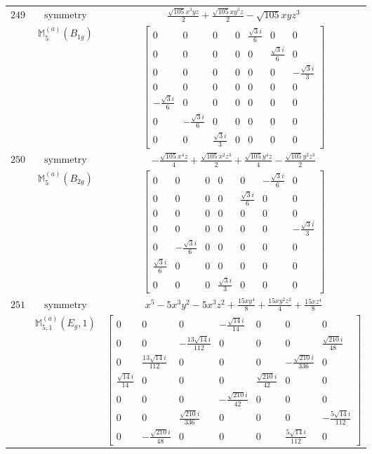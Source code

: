 \documentclass[fleqn,8pt,landscape]{jsarticle}
\begin{document}
\begin{longtable}{ccc}
$ 249 $ & $ \text{symmetry} $ & $ \frac{\sqrt{105} x^{3} y z}{2} + \frac{\sqrt{105} x y^{3} z}{2} - \sqrt{105} x y z^{3} $ \\
$  $ & $ \mathbb{M}_{5}^{(a)}(B_{1g}) $ & $ \begin{bmatrix} 0 & 0 & 0 & 0 & \frac{\sqrt{3} i}{6} & 0 & 0 \\ 0 & 0 & 0 & 0 & 0 & \frac{\sqrt{3} i}{6} & 0 \\ 0 & 0 & 0 & 0 & 0 & 0 & - \frac{\sqrt{3} i}{3} \\ 0 & 0 & 0 & 0 & 0 & 0 & 0 \\ - \frac{\sqrt{3} i}{6} & 0 & 0 & 0 & 0 & 0 & 0 \\ 0 & - \frac{\sqrt{3} i}{6} & 0 & 0 & 0 & 0 & 0 \\ 0 & 0 & \frac{\sqrt{3} i}{3} & 0 & 0 & 0 & 0 \end{bmatrix} $ \\ \hline
$ 250 $ & $ \text{symmetry} $ & $ - \frac{\sqrt{105} x^{4} z}{4} + \frac{\sqrt{105} x^{2} z^{3}}{2} + \frac{\sqrt{105} y^{4} z}{4} - \frac{\sqrt{105} y^{2} z^{3}}{2} $ \\
$  $ & $ \mathbb{M}_{5}^{(a)}(B_{2g}) $ & $ \begin{bmatrix} 0 & 0 & 0 & 0 & 0 & - \frac{\sqrt{3} i}{6} & 0 \\ 0 & 0 & 0 & 0 & \frac{\sqrt{3} i}{6} & 0 & 0 \\ 0 & 0 & 0 & 0 & 0 & 0 & 0 \\ 0 & 0 & 0 & 0 & 0 & 0 & - \frac{\sqrt{3} i}{3} \\ 0 & - \frac{\sqrt{3} i}{6} & 0 & 0 & 0 & 0 & 0 \\ \frac{\sqrt{3} i}{6} & 0 & 0 & 0 & 0 & 0 & 0 \\ 0 & 0 & 0 & \frac{\sqrt{3} i}{3} & 0 & 0 & 0 \end{bmatrix} $ \\ \hline
$ 251 $ & $ \text{symmetry} $ & $ x^{5} - 5 x^{3} y^{2} - 5 x^{3} z^{2} + \frac{15 x y^{4}}{8} + \frac{15 x y^{2} z^{2}}{4} + \frac{15 x z^{4}}{8} $ \\
$  $ & $ \mathbb{M}_{5,1}^{(a)}(E_{g},1) $ & $ \begin{bmatrix} 0 & 0 & 0 & - \frac{\sqrt{14} i}{14} & 0 & 0 & 0 \\ 0 & 0 & - \frac{13 \sqrt{14} i}{112} & 0 & 0 & 0 & \frac{\sqrt{210} i}{48} \\ 0 & \frac{13 \sqrt{14} i}{112} & 0 & 0 & 0 & - \frac{\sqrt{210} i}{336} & 0 \\ \frac{\sqrt{14} i}{14} & 0 & 0 & 0 & \frac{\sqrt{210} i}{42} & 0 & 0 \\ 0 & 0 & 0 & - \frac{\sqrt{210} i}{42} & 0 & 0 & 0 \\ 0 & 0 & \frac{\sqrt{210} i}{336} & 0 & 0 & 0 & - \frac{5 \sqrt{14} i}{112} \\ 0 & - \frac{\sqrt{210} i}{48} & 0 & 0 & 0 & \frac{5 \sqrt{14} i}{112} & 0 \end{bmatrix} $ \\ \hline

\end{longtable}
\end{document}
